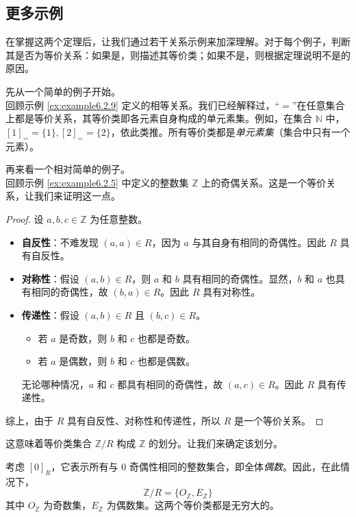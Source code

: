 
\subsection{更多示例}

在掌握这两个定理后，让我们通过若干关系示例来加深理解。对于每个例子，判断其是否为等价关系：如果是，则描述其等价类；如果不是，则根据定理说明不是的原因。

\begin{example}
    先从一个简单的例子开始。\\
    回顾示例 \ref{ex:example6.2.9} 定义的相等关系。我们已经解释过，``$=$''在任意集合上都是等价关系，其等价类即各元素自身构成的单元素集。例如，在集合 $\mathbb{N}$ 中，$[1]_{=} = \{1\}, [2]_{=} = \{2\}$，依此类推。所有等价类都是\emph{单元素集}（集合中只有一个元素）。
\end{example}

\begin{example}
    再来看一个相对简单的例子。\\
    回顾示例 \ref{ex:example6.2.5} 中定义的整数集 $\mathbb{Z}$ 上的奇偶关系。这是一个等价关系，让我们来证明这一点。

    \begin{proof}
        设 $a, b, c \in \mathbb{Z}$ 为任意整数。
        \begin{itemize}
            \item \textbf{自反性}：不难发现 $(a,a) \in R$，因为 $a$ 与其自身有相同的奇偶性。因此 $R$ 具有自反性。
            \item \textbf{对称性}：假设 $(a,b) \in R$，则 $a$ 和 $b$ 具有相同的奇偶性。显然，$b$ 和 $a$ 也具有相同的奇偶性，故 $(b,a) \in R$。因此 $R$ 具有对称性。
            \item \textbf{传递性}：假设 $(a,b) \in R$ 且 $(b,c) \in R$。
            \begin{itemize}
                \item 若 $a$ 是奇数，则 $b$ 和 $c$ 也都是奇数。
                \item 若 $a$ 是偶数，则 $b$ 和 $c$ 也都是偶数。
            \end{itemize}
            无论哪种情况，$a$ 和 $c$ 都具有相同的奇偶性，故 $(a,c) \in R$。因此 $R$ 具有传递性。
        \end{itemize}
        综上，由于 $R$ 具有自反性、对称性和传递性，所以 $R$ 是一个等价关系。
    \end{proof}

    这意味着等价类集合 $\mathbb{Z}/R$ 构成 $\mathbb{Z}$ 的划分。让我们来确定该划分。

    考虑 $[0]_R$，它表示所有与 $0$ 奇偶性相同的整数集合，即全体\emph{偶数}。因此，在此情况下，
    \[\mathbb{Z}/R = \{O_{\mathbb{Z}}, E_{\mathbb{Z}}\}\]
    其中 $O_{\mathbb{Z}}$ 为奇数集，$E_{\mathbb{Z}}$ 为偶数集。这两个等价类都是无穷大的。
\end{example}

